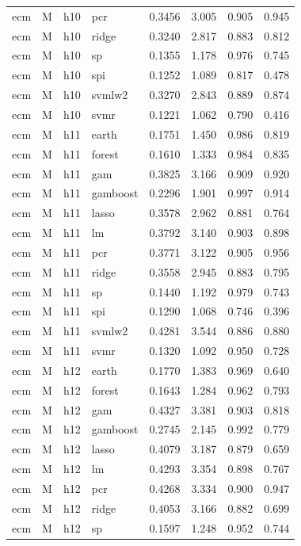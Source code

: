 \begin{ThreePartTable}
\begin{longtable}[t]{llclcccc}
ecm & M & h10 & pcr & 0.3456 & 3.005 & 0.905 & 0.945\\
ecm & M & h10 & ridge & 0.3240 & 2.817 & 0.883 & 0.812\\
ecm & M & h10 & sp & 0.1355 & 1.178 & 0.976 & 0.745\\
ecm & M & h10 & spi & 0.1252 & 1.089 & 0.817 & 0.478\\
ecm & M & h10 & svmlw2 & 0.3270 & 2.843 & 0.889 & 0.874\\
ecm & M & h10 & svmr & 0.1221 & 1.062 & 0.790 & 0.416\\
\addlinespace
ecm & M & h11 & earth & 0.1751 & 1.450 & 0.986 & 0.819\\
ecm & M & h11 & forest & 0.1610 & 1.333 & 0.984 & 0.835\\
ecm & M & h11 & gam & 0.3825 & 3.166 & 0.909 & 0.920\\
ecm & M & h11 & gamboost & 0.2296 & 1.901 & 0.997 & 0.914\\
ecm & M & h11 & lasso & 0.3578 & 2.962 & 0.881 & 0.764\\
ecm & M & h11 & lm & 0.3792 & 3.140 & 0.903 & 0.898\\
ecm & M & h11 & pcr & 0.3771 & 3.122 & 0.905 & 0.956\\
ecm & M & h11 & ridge & 0.3558 & 2.945 & 0.883 & 0.795\\
ecm & M & h11 & sp & 0.1440 & 1.192 & 0.979 & 0.743\\
ecm & M & h11 & spi & 0.1290 & 1.068 & 0.746 & 0.396\\
ecm & M & h11 & svmlw2 & 0.4281 & 3.544 & 0.886 & 0.880\\
ecm & M & h11 & svmr & 0.1320 & 1.092 & 0.950 & 0.728\\
\addlinespace
ecm & M & h12 & earth & 0.1770 & 1.383 & 0.969 & 0.640\\
ecm & M & h12 & forest & 0.1643 & 1.284 & 0.962 & 0.793\\
ecm & M & h12 & gam & 0.4327 & 3.381 & 0.903 & 0.818\\
ecm & M & h12 & gamboost & 0.2745 & 2.145 & 0.992 & 0.779\\
ecm & M & h12 & lasso & 0.4079 & 3.187 & 0.879 & 0.659\\
ecm & M & h12 & lm & 0.4293 & 3.354 & 0.898 & 0.767\\
ecm & M & h12 & pcr & 0.4268 & 3.334 & 0.900 & 0.947\\
ecm & M & h12 & ridge & 0.4053 & 3.166 & 0.882 & 0.699\\
ecm & M & h12 & sp & 0.1597 & 1.248 & 0.952 & 0.744\\

\end{longtable}
\end{ThreePartTable}

